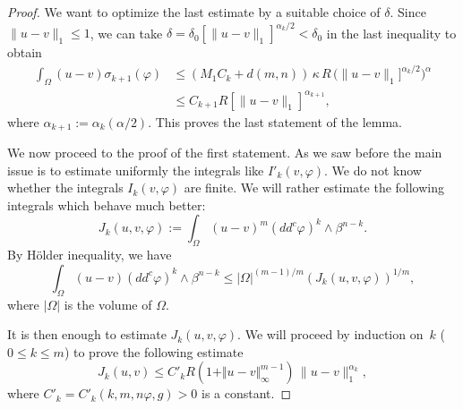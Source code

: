 \documentclass[11pt]{article}
\numberwithin{equation}{section}
\theoremstyle{definition}
\theoremstyle{plain}
\theoremstyle{definition}
\begin{document}
\begin{proof}
We want to optimize the last estimate by a suitable choice of $\delta$. Since $ \|u-v\|_1 \leq 1$, we can take $\delta= \delta_0 [\|u-v\|_1]^{\alpha_k\slash 2} < \delta_0$ in the last inequality to obtain
\begin{align*}
\int_{\Omega}(u-v) \sigma_{k+1}(\varphi) &\leq  (M_1 C_k
+ d (m,n))\, \kappa \, R \, \bigl(\|u-v\|_1]^{\alpha_k \slash 2} \bigr)^{\alpha } \\
& \leq C_{k + 1} R [\|u-v\|_1]^{\alpha_{k+ 1}},
\end{align*}
where $\alpha_{k + 1} := \alpha_k (\alpha \slash 2)$.
This proves the last statement of the lemma.

We now proceed to the proof of the first statement.
As we saw before the main issue is to estimate uniformly the integrals like $ I'_k (v,\varphi)$.
We do not know whether the integrals $I_k (v,\varphi)$ are finite. We will rather estimate the following integrals which behave much better:
\[
J_{k} (u,v,\varphi) := \int_{\Omega} (u-v)^m (dd^c \varphi)^{k} \wedge \beta^{n -k }.
\]
By Hölder inequality, we have
\begin{equation} \label{eq:Hineq2}
\int_\Omega (u-v) (dd^c \varphi)^k \wedge \beta^{n-k} \leq \vert \Omega\vert^{ (m-1) \slash m}\left(J_k (u,v,\varphi)\right)^{1 \slash m},
\end{equation}
where $\vert \Omega\vert$ is the volume of $\Omega$.

It is then enough to estimate $J_k (u,v,\varphi)$. We will proceed by induction on~$k$ \hbox{($0 \leq k \leq m$)} to prove the following estimate
\begin{equation} \label{eq:Jk}
J_k (u,v) \leq C'_k R (1 + \Vert u - v\Vert_{\infty}^{m -1} ) \, \|u-v\|_1^{\alpha_k},
\end{equation}
where $C'_k = C'_k (k,m,n\varphi,g) > 0$ is a constant.


\end{proof}
\end{document}
